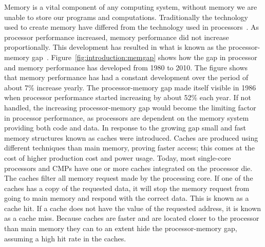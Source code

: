 Memory is a vital component of any computing system, without memory we are unable to store our programs and computations.
Traditionally the technology used to create memory have differed from the technology used in processors~\cite{Wilkes2001}.
As processor performance increased, memory performance did not increase proportionally.
This development has resulted in what is known as the processor-memory gap~\cite{Wilkes2001}.
Figure~\ref{fig:introduction:memgap} shows how the gap in processor and memory performance has developed from 1980 to 2010.
The figure shows that memory performance has had a constant development over the period of about 7\% increase yearly.
The processor-memory gap made itself visible in 1986 when processor performance started increasing by about 52\% each year.
If not handled, the increasing processor-memory gap would become the limiting factor in processor performance, as processors are dependent on the memory system providing both code and data.
In response to the growing gap small and fast memory structures known as caches were introduced.
Caches are produced using different techniques than main memory, proving faster access; this comes at the cost of higher production cost and power usage.
Today, most single-core processors and CMPs have one or more caches integrated on the processor die.
The caches filter all memory request made by the processing core.
If one of the caches has a copy of the requested data, it will stop the memory request from going to main memory and respond with the correct data.
This is known as a cache hit.
If a cache does not have the value of the requested address, it is known as a cache miss.
Because caches are faster and are located closer to the processor than main memory they can to an extent hide the processor-memory gap, assuming a high hit rate in the caches.


